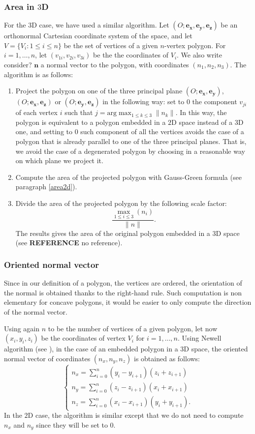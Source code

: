 \subsubsection{Area in $3$D}\label{area3d}
For the $3$D case, we have used a similar algorithm. Let $(O;\mathbf{e_x}, \mathbf{e_y}, \mathbf{e_z})$ be an orthonormal Cartesian coordinate system of the space, and let $V=\lbrace V_i : 1\leq i\leq n\rbrace$ be the set of vertices of a given $n$-vertex polygon. For $i=1,\ldots,n$, let $(v_{1i},v_{2i},v_{3i})$ be the the coordinates of $V_i$. We also write {\color{red}consider?} $\mathbf{n}$ a normal vector to the polygon, with coordinates $(n_1,n_2,n_3)$. The algorithm is as follows:
\begin{enumerate}
\item \label{pt1area3d} Project the polygon on one of the three principal plane $(O;\mathbf{e_x},\mathbf{e_y})$, $(O;\mathbf{e_x},\mathbf{e_z})$ or $(O;\mathbf{e_y},\mathbf{e_z})$ in the following way: set to $0$ the component $v_{ji}$ of each vertex $i$ such that $j=\text{arg} \max_{1\leq k \leq 3} \|n_k\|$. In this way, the polygon is equivalent to a polygon embedded in a $2$D space instead of a $3$D one, and setting to $0$ such component of all the vertices avoids the case of a polygon that is already parallel to one of the three principal planes. That is, we avoid the case of a degenerated polygon by choosing in a reasonable way on which plane we project it.  
\item Compute the area of the projected polygon with Gauss-Green formula (see paragraph \ref{area2d}). 
\item Divide the area of the projected polygon by the following scale factor: 
$$ \frac{\max_{1\leq i \leq 3}(n_i)}{\|n\|}. $$
The results gives the area of the original polygon embedded in a $3$D space (see \textbf{REFERENCE} {\color{red} no reference}).
\end{enumerate}

\subsubsection{Oriented normal vector}\label{onv}
Since in our definition of a polygon, the vertices are ordered, the orientation of the normal is obtained thanks to the right-hand rule. Such computation is non elementary for concave polygons, it would be easier to only compute the direction of the normal vector.

Using again $n$ to be the number of vertices of a given polygon, let now $(x_i,y_i,z_i)$ be the coordinates of vertex $V_i$ for $i=1,\ldots,n$. 
Using Newell algorithm (see \cite{newell}), in the case of an embedded polygon in a $3$D space, the oriented normal vector of coordinates $(n_x,n_y,n_z)$ is obtained as follows:
$$
\begin{cases}
n_x=\sum_{i=0}^{n} (y_i-y_{i+1})(z_i+z_{i+1}) \\
n_y=\sum_{i=0}^{n} (z_i-z_{i+1})(x_i+x_{i+1}) \\
n_z=\sum_{i=0}^{n} (x_i-x_{i+1})(y_i+y_{i+1}). 
\end{cases}
$$
In the $2$D case, the algorithm is similar except that we do not need to compute $n_x$ and $n_y$ since they will be set to $0$. 

